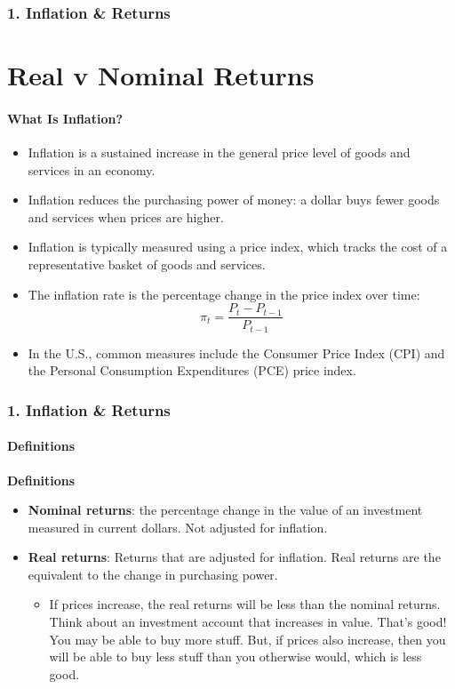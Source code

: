 \documentclass{beamer}
\begin{document}
\begin{frame}[t]
    \frametitle{1. Inflation \& Returns}
    \section{Real v Nominal Returns}
    \framesubtitle{What Is Inflation?}

    \begin{itemize}
        \item Inflation is a sustained increase in the general
        price level of goods and services in an economy.

        \item Inflation reduces the purchasing power of money:
        a dollar buys fewer goods and services when prices are higher.

        \item Inflation is typically measured using a price index,
        which tracks the cost of a representative basket of goods and services.

        \item The inflation rate is the percentage change in the
        price index over time:
        \[
        \pi_t = \frac{P_t-P_{t-1}}{P_{t-1}}
        \]

        \item In the U.S., common measures include the
        Consumer Price Index (CPI) and the
        Personal Consumption Expenditures (PCE) price index.
    \end{itemize}

\end{frame}



\begin{frame}[t]
    \frametitle{1. Inflation \& Returns}
    \framesubtitle{Definitions}

    \textbf{Definitions}

    \begin{itemize}
        \item \textbf{Nominal returns}: the percentage change in the value of an investment measured in current dollars.   Not adjusted for inflation.
        \item \textbf{Real returns}: Returns that are adjusted for inflation.   Real returns are the equivalent to the change in purchasing power.
        \begin{itemize}
            \item If prices increase, the real returns will be less than the nominal returns.   Think about an investment account that increases in value.   That's good!   You may be able to buy more stuff.  But, if prices also increase, then you will be able to buy less stuff than you otherwise would, which is less good.
        \end{itemize}
    \end{itemize}

\end{frame}
\end{document}
